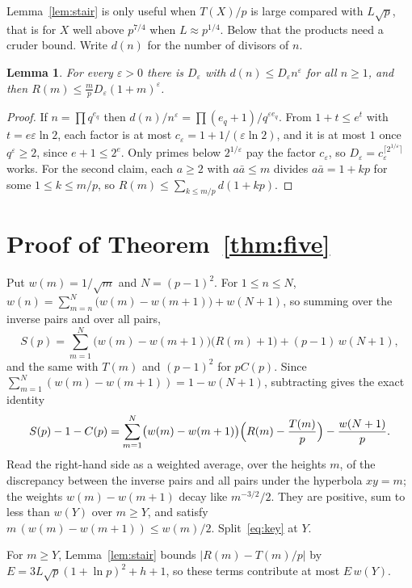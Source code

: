 \documentclass[11pt]{amsart}
\newtheorem{lemma}[theorem]{Lemma}
\theoremstyle{remark}
\begin{document}
Lemma~\ref{lem:stair} is only useful when $T(X)/p$ is large compared with $L\sqrt p$, that is for $X$ well above $p^{7/4}$ when $L\approx p^{1/4}$. Below that the products need a cruder bound. Write $d(n)$ for the number of divisors of $n$.

\begin{lemma}\label{lem:small}
For every $\varepsilon>0$ there is $D_\varepsilon$ with $d(n)\le D_\varepsilon n^\varepsilon$ for all $n\ge1$, and then $R(m)\le\frac mpD_\varepsilon(1+m)^\varepsilon$.
\end{lemma}

\begin{proof}
If $n=\prod q^{e_q}$ then $d(n)/n^\varepsilon=\prod(e_q+1)/q^{\varepsilon e_q}$. From $1+t\le e^t$ with $t=e\varepsilon\ln2$, each factor is at most $c_\varepsilon=1+1/(\varepsilon\ln2)$, and it is at most $1$ once $q^\varepsilon\ge2$, since $e+1\le2^e$. Only primes below $2^{1/\varepsilon}$ pay the factor $c_\varepsilon$, so $D_\varepsilon=c_\varepsilon^{\lceil2^{1/\varepsilon}\rceil}$ works. For the second claim, each $a\ge2$ with $a\bar a\le m$ divides $a\bar a=1+kp$ for some $1\le k\le m/p$, so $R(m)\le\sum_{k\le m/p}d(1+kp)$.
\end{proof}

\section{Proof of Theorem~\ref{thm:five}}

Put $w(m)=1/\sqrt m$ and $N=(p-1)^2$. For $1\le n\le N$, $w(n)=\sum_{m=n}^{N}\bigl(w(m)-w(m+1)\bigr)+w(N+1)$, so summing over the inverse pairs and over all pairs,
\[
S(p)=\sum_{m=1}^N\bigl(w(m)-w(m+1)\bigr)\bigl(R(m)+1\bigr)+(p-1)\,w(N+1),
\]
and the same with $T(m)$ and $(p-1)^2$ for $pC(p)$. Since $\sum_{m=1}^N(w(m)-w(m+1))=1-w(N+1)$, subtracting gives the exact identity
\begin{equation}\label{eq:key}
S(p)-1-C(p)=\sum_{m=1}^N\bigl(w(m)-w(m+1)\bigr)\Bigl(R(m)-\frac{T(m)}p\Bigr)-\frac{w(N+1)}p .
\end{equation}
Read the right-hand side as a weighted average, over the heights $m$, of the discrepancy between the inverse pairs and all pairs under the hyperbola $xy=m$; the weights $w(m)-w(m+1)$ decay like $m^{-3/2}/2$. They are positive, sum to less than $w(Y)$ over $m\ge Y$, and satisfy $m\,(w(m)-w(m+1))\le w(m)/2$. Split~\eqref{eq:key} at $Y$.

For $m\ge Y$, Lemma~\ref{lem:stair} bounds $|R(m)-T(m)/p|$ by $E=3L\sqrt p(1+\ln p)^2+h+1$, so these terms contribute at most $E\,w(Y)$.
\end{document}
